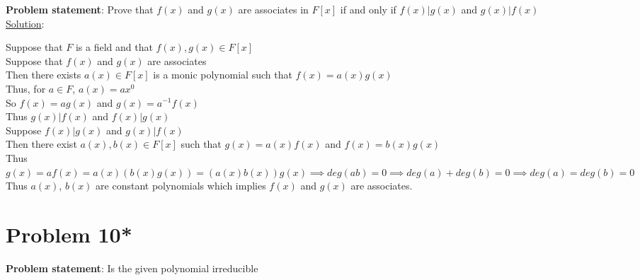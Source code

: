 \documentclass{article} %
\begin{document}
\textbf{Problem statement}: Prove that $f(x)$ and $g(x)$ are associates in $F[x]$ if and only if $f(x)|g(x)$ and $g(x)|f(x)$
\\


\underline{Solution}: 
\begin{addmargin}[1em]{0em}
Suppose that $F$ is a field and that $f(x), g(x) \in F[x]$
\\ \marginpar{$\Rightarrow$}
Suppose that $f(x)$ and $g(x)$ are associates
\\Then there exists $a(x) \in F[x]$ is a monic polynomial such that $f(x) = a(x)g(x)$
\\Thus, for $a \in F$, $a(x) = ax^0$
\\So $f(x) = ag(x)$ and $g(x) = a^{-1}f(x)$
\\Thus $g(x)|f(x)$ and $f(x)|g(x)$
\\ \marginpar{$\Leftarrow$}
Suppose $f(x)|g(x)$ and $g(x)|f(x)$
\\Then there exist $a(x),b(x) \in F[x]$ such that $g(x) = a(x)f(x)$ and $f(x) = b(x)g(x)$
\\Thus $g(x) = af(x) = a(x)(b(x)g(x)) = (a(x)b(x))g(x) \implies deg(ab) = 0 \implies deg(a) + deg(b) = 0 \implies deg(a) = deg(b) = 0$
\\Thus $a(x)$, $b(x)$ are constant polynomials which implies $f(x)$ and $g(x)$ are associates.
\end{addmargin}

\newpage

\section*{Problem 10*}


\textbf{Problem statement}: Is the given polynomial irreducible
\\
\end{document}
